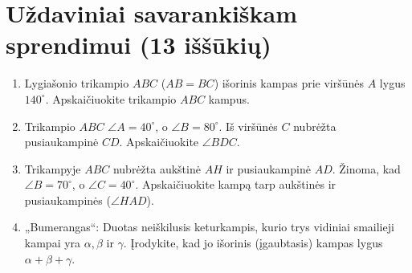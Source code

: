 \documentclass[11pt,a4paper]{scrartcl}
\begin{document}
\vspace{0.5cm}

\newpage
\section{Uždaviniai savarankiškam sprendimui (13 iššūkių)}

\begin{enumerate}
    \renewcommand{\labelenumi}{\textbf{\theenumi.}}
    
    \item Lygiašonio trikampio $ABC$ ($AB=BC$) išorinis kampas prie viršūnės $A$ lygus $140^\circ$. Apskaičiuokite trikampio $ABC$ kampus.
    \item Trikampio $ABC$ $\angle A = 40^\circ$, o $\angle B = 80^\circ$. Iš viršūnės $C$ nubrėžta pusiaukampinė $CD$. Apskaičiuokite $\angle BDC$.
    \item Trikampyje $ABC$ nubrėžta aukštinė $AH$ ir pusiaukampinė $AD$. Žinoma, kad $\angle B = 70^\circ$, o $\angle C = 40^\circ$. Apskaičiuokite kampą tarp aukštinės ir pusiaukampinės ($\angle HAD$).
    
    \item „Bumerangas“: Duotas neiškilusis keturkampis, kurio trys vidiniai smailieji kampai yra $\alpha, \beta$ ir $\gamma$. Įrodykite, kad jo išorinis (įgaubtasis) kampas lygus $\alpha + \beta + \gamma$.
    \begin{center}
    \end{center}
    

\end{enumerate}
\end{document}

